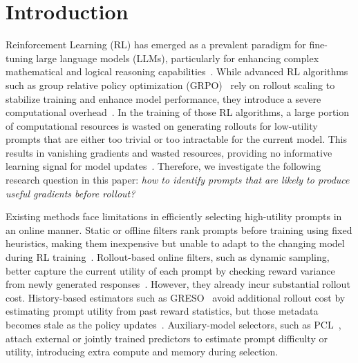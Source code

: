 
\section{Introduction}
\label{sec:introduction}
Reinforcement Learning (RL) has emerged as a prevalent paradigm for fine-tuning large language models (LLMs), particularly for enhancing complex mathematical and logical reasoning capabilities~\cite{guo2025deepseek,yu2025dapo,tomihari2026learningdynamicsrlposttraining}. While advanced RL algorithms such as group relative policy optimization (GRPO)~\cite{shao2024deepseekmath} rely on rollout scaling to stabilize training and enhance model performance, they introduce a severe computational overhead~\cite{xu2025not,yu2025dapo,li2026stalefeedbackcoevolvingcritics}. In the training of those RL algorithms, a large portion of computational resources is wasted on generating rollouts for low-utility prompts that are either too trivial or too intractable for the current model. This results in vanishing gradients and wasted resources, providing no informative learning signal for model updates~\cite{zheng2025act,yu2025dapo,noukhovitch2025fasterICLR,verl2025}. Therefore, we investigate the following research question in this paper: \textit{how to identify prompts that are likely to produce useful gradients before rollout?}

Existing methods face limitations in efficiently selecting {high-utility} prompts in an online manner. Static or offline filters rank prompts before training using fixed heuristics, making them inexpensive but unable to adapt to the changing model during RL 
training~\cite{Wang2025ReinforcementLF,Li2025LIMRLI,ye2025limo}. Rollout-based online filters, such as dynamic sampling, better capture the current utility of each prompt by checking reward variance from newly generated responses~\cite{yu2025dapo,xu2025not,Chen2025LSPO,Ye2025PROF}. However, they already incur substantial rollout cost. History-based estimators such as GRESO~\cite{zheng2025act} avoid additional 
rollout cost by estimating prompt utility from past reward statistics, but those metadata becomes stale as the policy 
updates~\cite{zheng2025act,sun2025dots,li2026stalefeedbackcoevolvingcritics}. Auxiliary-model selectors, such as PCL~\cite{Gao2025PCL}, attach external or jointly trained predictors to estimate prompt difficulty or utility, introducing extra compute and memory during selection. 


